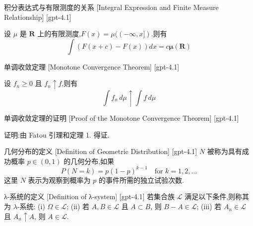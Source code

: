 \documentclass[UTF8]{ctexart}
\begin{document}
    
    
    \begin{thm}
        {积分表达式与有限测度的关系}
        [Integral Expression and Finite Measure Relationship]
        [gpt-4.1]
        
设 $\mu$ 是 $\mathbf{R}$ 上的有限测度,$F(x) = \mu((-\infty, x])$.则有
\[
\int \left( F(x + c) - F(x) \right) dx = c \boldsymbol{\mu}(\mathbf{R})
\]

    \end{thm}
    
    
    
    \begin{thm}
        {单调收敛定理}
        [Monotone Convergence Theorem]
        [gpt-4.1]
        
设 $f_{n} \geq 0$ 且 $f_{n} \uparrow f$,则有
\[
\int f_{n} \, d\mu \uparrow \int f \, d\mu
\]

    \end{thm}
    
    
    
    \begin{prf}
        {单调收敛定理的证明}
        [Proof of the Monotone Convergence Theorem]
        [gpt-4.1]
        
证明:由 Fatou 引理和定理 1. 得证.

    \end{prf}
    
    
    
    \begin{dfn}
        {几何分布的定义}
        [Definition of Geometric Distribution]
        [gpt-4.1]
        $N$ 被称为具有成功概率 $p \in (0, 1)$ 的几何分布,如果
\[
P(N = k) = p (1 - p)^{k - 1} \quad \text{for } k = 1, 2, \ldots
\]
这里 $N$ 表示为观察到概率为 $p$ 的事件所需的独立试验次数.
    \end{dfn}
    
    
    
    \begin{dfn}
        {λ-系统的定义}
        [Definition of λ-system]
        [gpt-4.1]
        若集合族 $\mathcal{L}$ 满足以下条件,则称其为 $\lambda$-系统:
(i) $\Omega \in \mathcal{L}$;
(ii) 若 $A, B \in \mathcal{L}$ 且 $A \subset B$, 则 $B - A \in \mathcal{L}$;
(iii) 若 $A_n \in \mathcal{L}$ 且 $A_n \uparrow A$, 则 $A \in \mathcal{L}$.

    \end{dfn}
    
\end{document}
